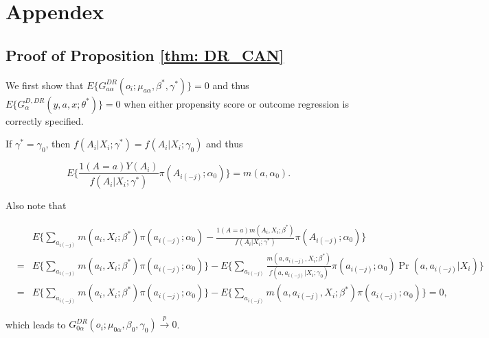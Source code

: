 \documentclass[oupdraft]{bio}
\begin{document}
\vspace{-.3cm}
\section{Appendex}
\vspace{3mm}

\subsection*{Proof of Proposition \ref{thm: DR_CAN}}

We first show that $E\{G^{DR}_{a\alpha}(o_i;\mu_{a\alpha},\beta^{*},\gamma^{*})\}=0$ and thus $E\{G^{D,DR}_{\alpha}(y,a,x;\theta^{*})\}=0$ when either propensity score or outcome regression is correctly specified.


If $\gamma^{*}=\gamma_0$, then ${f}(A_i|X_i;\gamma^{*})=f(A_i|X_i;\gamma_0)$ and thus


\vspace{-0.4cm}
\begin{equation*}
  E\Biggl\{\frac{1(A=a)Y(A_i)}{{f}(A_i|X_i;\gamma^{*})}\pi(A_{i(-j)};\alpha_0)\Biggr\}=m(a,\alpha_0).
\end{equation*}

\vspace{-0.3cm}
\noindent Also note that


\vspace{-1cm}
\begin{eqnarray*}
&&  E\Biggl\{\sum_{a_{i(-j)}}m(a_i,X_i;\beta^{*})\pi(a_{i(-j)};\alpha_0)
  -
  \frac{1(A=a)m(A_i,X_i;\beta^{*})}{f(A_i|X_i;\gamma^{*})}\pi(A_{i(-j)};\alpha_0)\Biggr\}\\
&=&  E\Biggl\{\sum_{a_{i(-j)}}m(a_i,X_i;\beta^{\ast})\pi(a_{i(-j)};\alpha_0)\Biggr\}
  - E\Biggl\{\sum_{a_{i(-j)}}\frac{m(a,a_{i(-j)},X_i;\beta^{\ast})}{{f}(a,a_{i(-j)}|X_i;\gamma_0)}
  \pi(a_{i(-j)};\alpha_0)\Pr(a,a_{i(-j)}|X_i)\Biggr\}\\
&=&  E\Biggl\{\sum_{a_{i(-j)}}m(a_i,X_i;\beta^{\ast})\pi(a_{i(-j)};\alpha_0)\Biggr\}
  - E\Biggl\{\sum_{a_{i(-j)}}m(a,a_{i(-j)},X_i;\beta^{\ast})
  \pi(a_{i(-j)};\alpha_0)\Biggr\}
=0,
  \end{eqnarray*}

\noindent which leads to $G^{DR}_{0\alpha}(o_i;\mu_{0\alpha},\beta_0,\gamma_0)\xrightarrow{p}0$.
\end{document}
